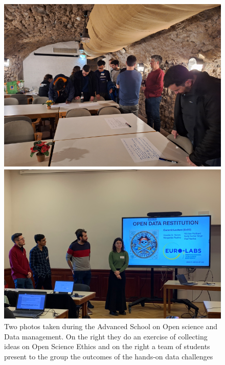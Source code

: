 \begin{figure}[!h]
    \centering
\begin{minipage}{0.48\textwidth}
        \centering
        \includegraphics[width=\textwidth]{graphics/Open science ethics.png}
    \end{minipage}
    \hfill %
    \begin{minipage}{0.51\textwidth}
        \centering
        \includegraphics[width=\textwidth]{graphics/presentation-Open Science.png}
    \end{minipage}   
 \caption{Two photos taken during the Advanced School on Open science and Data management. On the right they do an exercise of collecting ideas on Open Science Ethics and on the right a team of students present to the group the outcomes of the hands-on data challenges}
    \label{fig:ATSOA25}
\end{figure}


